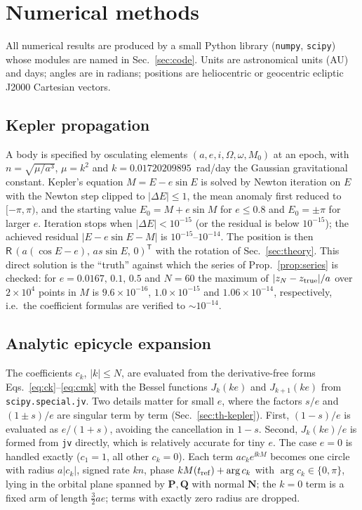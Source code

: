\section{Numerical methods}
\label{sec:numerics}

All numerical results are produced by a small Python library
(\texttt{numpy}, \texttt{scipy}) whose modules are named in
Sec.~\ref{sec:code}. Units are astronomical units (AU) and days; angles are in
radians; positions are heliocentric or geocentric ecliptic J2000 Cartesian
vectors.

\subsection{Kepler propagation}
\label{sec:num-kepler}

A body is specified by osculating elements $(a,e,i,\Omega,\omega,M_0)$ at an
epoch, with $n=\sqrt{\mu/a^3}$, $\mu=k^2$ and $k=0.01720209895$~rad/day the
Gaussian gravitational constant. Kepler's equation $M=E-e\sin E$ is solved by
Newton iteration on $E$ with the Newton step clipped to $|\Delta E|\le1$, the
mean anomaly first reduced to $[-\pi,\pi)$, and the starting value
$E_0=M+e\sin M$ for $e\le0.8$ and $E_0=\pm\pi$ for larger $e$. Iteration stops
when $|\Delta E|<10^{-15}$ (or the residual is below $10^{-15}$); the achieved
residual $|E-e\sin E-M|$ is $10^{-15}$--$10^{-14}$. The position is then
$\mathsf R\,(a(\cos E-e),\,as\sin E,\,0)^{\mathsf T}$ with the rotation of
Sec.~\ref{sec:theory}. This direct solution is the ``truth'' against which
the series of Prop.~\ref{prop:series} is checked: for $e=0.0167,\,0.1,\,0.5$ and
$N=60$ the maximum of $|z_N-z_{\rm true}|/a$ over $2\times10^4$ points in $M$ is
$9.6\times10^{-16}$, $1.0\times10^{-15}$ and $1.06\times10^{-14}$,
respectively, i.e.\ the coefficient formulas are verified to
$\sim10^{-14}$.

\subsection{Analytic epicycle expansion}
\label{sec:num-expansion}

The coefficients $c_k$, $|k|\le N$, are evaluated from the derivative-free
forms Eqs.~\eqref{eq:ck}--\eqref{eq:cmk} with the Bessel functions
$J_k(ke)$ and $J_{k+1}(ke)$ from \texttt{scipy.special.jv}. Two details
matter for small $e$, where the factors $s/e$ and $(1\pm s)/e$ are singular
term by term (Sec.~\ref{sec:th-kepler}). First, $(1-s)/e$ is evaluated as
$e/(1+s)$, avoiding the cancellation in $1-s$. Second, $J_k(ke)/e$ is formed
from \texttt{jv} directly, which is relatively accurate for tiny $e$. The case
$e=0$ is handled exactly ($c_1=1$, all other $c_k=0$). Each term
$a c_ke^{\ii kM}$ becomes one circle with radius $a|c_k|$, signed rate $kn$,
phase $kM(t_{\rm ref})+\arg c_k$ with $\arg c_k\in\{0,\pi\}$, lying in the orbital
plane spanned by $\mathbf P,\mathbf Q$ with normal $\mathbf N$; the $k=0$ term is
a fixed arm of length $\tfrac32ae$; terms with exactly zero radius are dropped.

